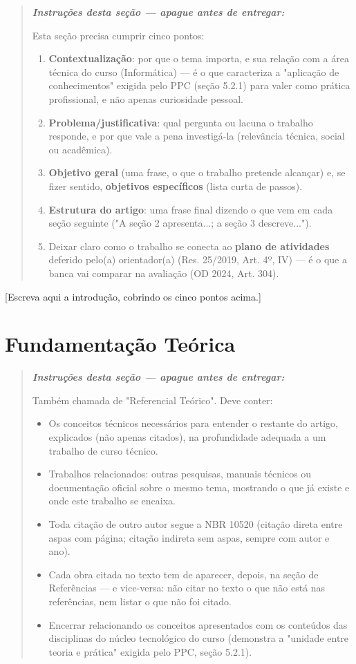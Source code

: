 \documentclass[article,12pt,a4paper]{abntex2}
\newenvironment{instrucoes}{%
  \begin{quotation}\footnotesize\itshape
  \noindent\textbf{\upshape Instruções desta seção — apague antes de entregar:}\par\smallskip
}{%
  \end{quotation}
}
\begin{document}
\begin{instrucoes}
Esta seção precisa cumprir cinco pontos:
\begin{enumerate}
  \item \textbf{Contextualização}: por que o tema importa, e sua relação com a área técnica do curso (Informática) — é o que caracteriza a "aplicação de conhecimentos" exigida pelo PPC (seção 5.2.1) para valer como prática profissional, e não apenas curiosidade pessoal.
  \item \textbf{Problema/justificativa}: qual pergunta ou lacuna o trabalho responde, e por que vale a pena investigá-la (relevância técnica, social ou acadêmica).
  \item \textbf{Objetivo geral} (uma frase, o que o trabalho pretende alcançar) e, se fizer sentido, \textbf{objetivos específicos} (lista curta de passos).
  \item \textbf{Estrutura do artigo}: uma frase final dizendo o que vem em cada seção seguinte ("A seção 2 apresenta...; a seção 3 descreve...").
  \item Deixar claro como o trabalho se conecta ao \textbf{plano de atividades} deferido pelo(a) orientador(a) (Res. 25/2019, Art. 4º, IV) — é o que a banca vai comparar na avaliação (OD 2024, Art. 304).
\end{enumerate}
\end{instrucoes}

[Escreva aqui a introdução, cobrindo os cinco pontos acima.]

\section{Fundamentação Teórica}

\begin{instrucoes}
Também chamada de "Referencial Teórico". Deve conter:
\begin{itemize}
  \item Os conceitos técnicos necessários para entender o restante do artigo, explicados (não apenas citados), na profundidade adequada a um trabalho de curso técnico.
  \item Trabalhos relacionados: outras pesquisas, manuais técnicos ou documentação oficial sobre o mesmo tema, mostrando o que já existe e onde este trabalho se encaixa.
  \item Toda citação de outro autor segue a NBR 10520 (citação direta entre aspas com página; citação indireta sem aspas, sempre com autor e ano).
  \item Cada obra citada no texto tem de aparecer, depois, na seção de Referências — e vice-versa: não citar no texto o que não está nas referências, nem listar o que não foi citado.
  \item Encerrar relacionando os conceitos apresentados com os conteúdos das disciplinas do núcleo tecnológico do curso (demonstra a "unidade entre teoria e prática" exigida pelo PPC, seção 5.2.1).
\end{itemize}
\end{instrucoes}
\end{document}
